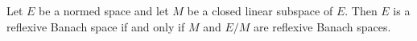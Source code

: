 Let $E$ be a normed space and let $M$ be a closed linear subspace of $E$. Then $E$ is a reflexive Banach space if and only if $M$ and $E/M$ are reflexive Banach spaces.
